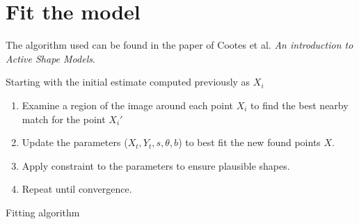 \section{Fit the model}

The algorithm used can be found in the paper of Cootes et al.
\textit{An introduction to Active Shape Models}.

Starting with the initial estimate computed previously as $X_i$
\begin{algorithm}
  \begin{enumerate}
  \item Examine a region of the image around each point $X_i$
    to find the best nearby match for the point ${X_i}'$
  \item Update the parameters ($X_t, Y_t, s, \theta, b$) to best
    fit the new found points $X$.
  \item Apply constraint to the parameters to ensure
    plausible shapes.
  \item Repeat until convergence.
 \end{enumerate}
\caption{Fitting algorithm}
\end{algorithm}